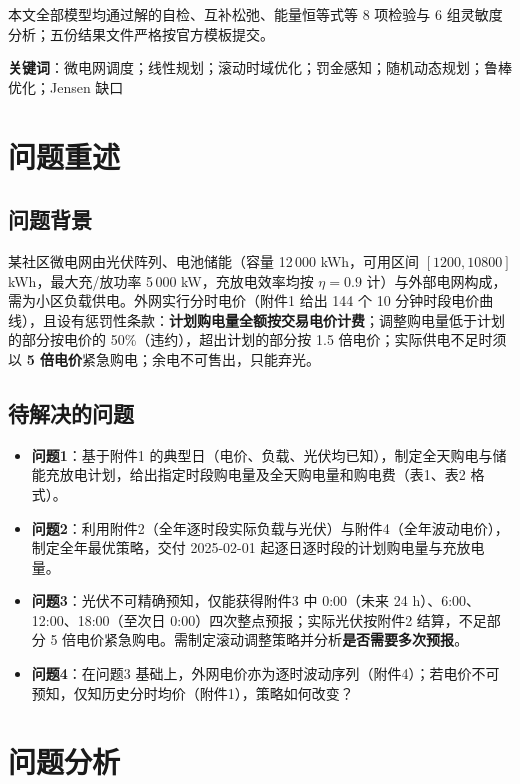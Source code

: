\documentclass[11pt,a4paper]{ctexart}
\begin{document}
本文全部模型均通过解的自检、互补松弛、能量恒等式等 8 项检验与 6 组灵敏度分析；五份结果文件严格按官方模板提交。

\vspace{0.6em}
\noindent\textbf{关键词}：微电网调度；线性规划；滚动时域优化；罚金感知；随机动态规划；鲁棒优化；Jensen 缺口
\newpage

\tableofcontents
\newpage

\section{问题重述}

\subsection{问题背景}
某社区微电网由光伏阵列、电池储能（容量 12\,000 kWh，可用区间 $[1200,10800]$ kWh，最大充/放功率 5\,000 kW，充放电效率均按 $\eta=0.9$ 计）与外部电网构成，需为小区负载供电。外网实行分时电价（附件1 给出 144 个 10 分钟时段电价曲线），且设有惩罚性条款：\textbf{计划购电量全额按交易电价计费}；调整购电量低于计划的部分按电价的 50\%（违约），超出计划的部分按 1.5 倍电价；实际供电不足时须以 \textbf{5 倍电价}紧急购电；余电不可售出，只能弃光。

\subsection{待解决的问题}
\begin{itemize}
  \item \textbf{问题1}：基于附件1 的典型日（电价、负载、光伏均已知），制定全天购电与储能充放电计划，给出指定时段购电量及全天购电量和购电费（表1、表2 格式）。
  \item \textbf{问题2}：利用附件2（全年逐时段实际负载与光伏）与附件4（全年波动电价），制定全年最优策略，交付 2025-02-01 起逐日逐时段的计划购电量与充放电量。
  \item \textbf{问题3}：光伏不可精确预知，仅能获得附件3 中 0:00（未来 24 h）、6:00、12:00、18:00（至次日 0:00）四次整点预报；实际光伏按附件2 结算，不足部分 5 倍电价紧急购电。需制定滚动调整策略并分析\textbf{是否需要多次预报}。
  \item \textbf{问题4}：在问题3 基础上，外网电价亦为逐时波动序列（附件4）；若电价不可预知，仅知历史分时均价（附件1），策略如何改变？
\end{itemize}

\section{问题分析}
\end{document}
